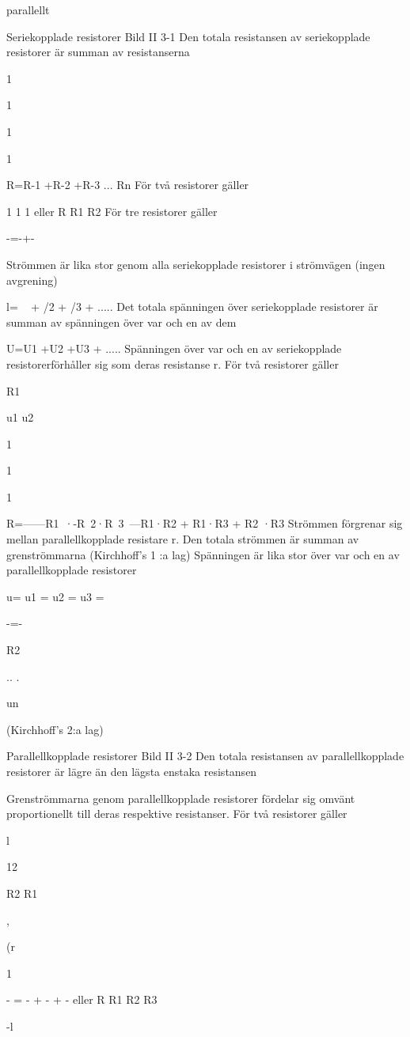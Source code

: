 \documentclass[a4paper,twoside,twocolumn,openright]{book}
\begin{document}
{{{{parallellt

Seriekopplade resistorer
Bild II 3-1
Den totala resistansen av seriekopplade
resistorer är summan av resistanserna

1

1

1

1

R=R-1 +R-2 +R-3 ... Rn
För två resistorer gäller

1
1
1
eller
R R1 R2
För tre resistorer gäller

-=-+-

Strömmen är lika stor genom alla seriekopplade resistorer i strömvägen (ingen avgrening)

l= ~ + /2 + /3 + .....
Det totala spänningen över seriekopplade
resistorer är summan av spänningen över
var och en av dem

U=U1 +U2 +U3 + .....
Spänningen över var och en av seriekopplade
resistorerförhåller sig som deras resistanse r.
För två resistorer gäller

R1

u1
u2

1

1

1

R=------R1~·-R~2·R~3~---R1·R2 + R1·R3 + R2 ·R3
Strömmen förgrenar sig mellan parallellkopplade resistare r. Den totala strömmen är
summan av grenströmmarna
(Kirchhoff's 1 :a lag)
Spänningen är lika stor över var och en av
parallellkopplade resistorer

u= u1 = u2 = u3 =

-=-

R2

.. .

un

(Kirchhoff's 2:a lag)

Parallellkopplade resistorer
Bild II 3-2
Den totala resistansen av parallellkopplade
resistorer är lägre än den lägsta enstaka
resistansen

Grenströmmarna genom parallellkopplade
resistorer fördelar sig omvänt proportionellt
till deras respektive resistanser.
För två resistorer gäller

l

12

R2
R1

,

(r

1

- = - + - + - eller
R R1 R2 R3

-l

}}}}
\end{document}
